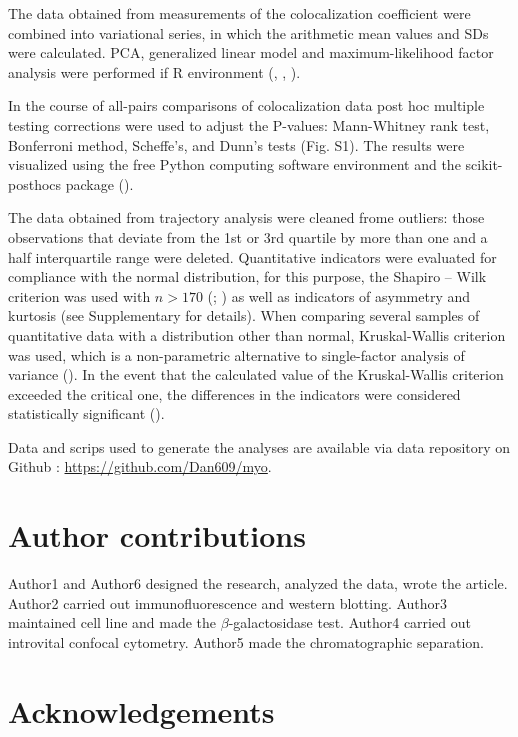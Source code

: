 \documentclass[alpha-refs]{wiley-article}
\begin{document}
The data obtained from measurements of the colocalization coefficient were combined into variational series, in which the arithmetic mean values and SDs were calculated.
PCA, generalized linear model and maximum-likelihood factor analysis were performed if R environment (\cite{husson2010exploratory}, \cite{dobson2008introduction}, \cite{lawley1971factor}).

In the course of all-pairs comparisons of colocalization data post hoc multiple testing corrections were used to adjust the P-values: Mann-Whitney rank test, Bonferroni method, Scheffe’s, and Dunn’s tests (Fig. S1).
The results were visualized using the free Python computing software environment and the scikit-posthocs package (\cite{Terpilowski2019}).

The data obtained from trajectory analysis were cleaned frome outliers: those observations that deviate from the 1st or 3rd quartile by more than one and a half interquartile range were deleted.
Quantitative indicators were evaluated for compliance with the normal distribution, for this purpose, the Shapiro – Wilk criterion  was used with $n > 170$ (\cite{shapiro1965analysis}; \cite{shapiro1972approximate}) as well as indicators of asymmetry and kurtosis (see Supplementary for details).
When comparing several samples of quantitative data with a distribution other than normal, Kruskal-Wallis criterion was used, which is a non-parametric alternative to single-factor analysis of variance (\cite{kruskal1952use}).
In the event that the calculated value of the Kruskal-Wallis criterion exceeded the critical one, the differences in the indicators were considered statistically significant (\cite{wilcoxon1992individual}).

Data and scrips used to generate the analyses are available via data repository on Github : \url{https://github.com/Dan609/myo}.


\section*{Author contributions}

Author1 and Author6 designed the research, analyzed the data, wrote the article.
Author2 carried out immunofluorescence and western blotting.
Author3 maintained cell line and made the $\beta$-galactosidase test.
Author4 carried out introvital confocal cytometry.
Author5 made the chromatographic separation.

\section*{Acknowledgements}
\end{document}
